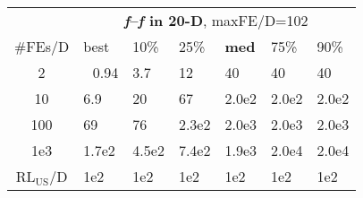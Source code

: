\begin{tabular}{c|llllll}
 & \multicolumn{6}{|c}{\textbf{\textit{f}\raisebox{-0.35ex}{1}--\textit{f}\raisebox{-0.35ex}{24} in 20-D}, maxFE/D=102}\\
\#FEs/D & best & 10\% & 25\% & \textbf{med} & 75\% & 90\%\\
2 & ~\,0.94 & \hspace*{1ex}3.7 & 12 & 40 & 40 & 40\\
10 & \hspace*{1ex}6.9 & 20 & 67 & 2.0e2 & 2.0e2 & 2.0e2\\
100 & 69 & 76 & 2.3e2 & 2.0e3 & 2.0e3 & 2.0e3\\
1e3 & 1.7e2 & 4.5e2 & 7.4e2 & 1.9e3 & 2.0e4 & 2.0e4\\
$\text{RL}_{\text{US}}$/D & 1e2 & 1e2 & 1e2 & 1e2 & 1e2 & 1e2
\end{tabular}
